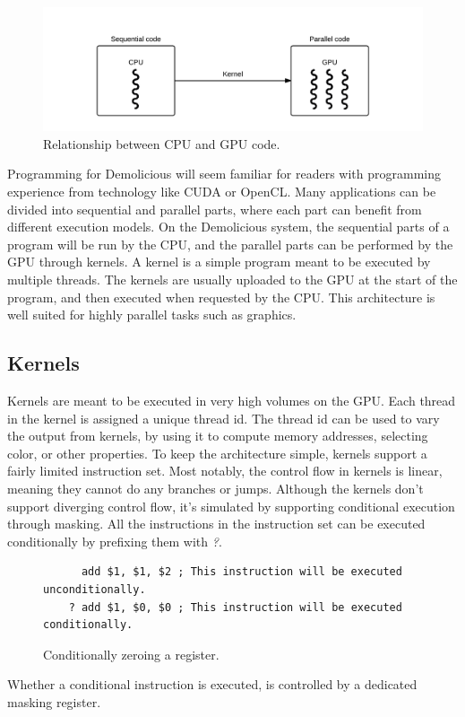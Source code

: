 \begin{figure}[H]
	\centering
	\includegraphics[width=\textwidth]{system_overview/diagrams/programming_model_cpu_gpu.png}
	\caption{Relationship between CPU and GPU code.}
	\label{fig:programming_model_cpu_gpu}
\end{figure}
Programming for Demolicious will seem familiar for readers with programming experience from technology like CUDA or OpenCL. 
Many applications can be divided into sequential and parallel parts, where each part can benefit from different execution models. 
On the Demolicious system, the sequential parts of a program will be run by the CPU, and the parallel parts can be performed by the GPU through kernels.
A kernel is a simple program meant to be executed by multiple threads.
The kernels are usually uploaded to the GPU at the start of the program, and then executed when requested by the CPU.
This architecture is well suited for highly parallel tasks such as graphics.

\subsection{Kernels}
Kernels are meant to be executed in very high volumes on the GPU.
Each thread in the kernel is assigned a unique thread id.
The thread id can be used to vary the output from kernels, 
by using it to compute memory addresses, selecting color, or other properties.
To keep the architecture simple, kernels support a fairly limited instruction set.
Most notably, the control flow in kernels is linear, meaning they cannot do any branches or jumps.
Although the kernels don't support diverging control flow,
it's simulated by supporting conditional execution through masking.
All the instructions in the instruction set can be executed conditionally by prefixing them with \textit{?}.
\begin{figure}[H]
	\centering
	\begin{verbatim}
	  add $1, $1, $2 ; This instruction will be executed unconditionally.
	? add $1, $0, $0 ; This instruction will be executed conditionally.
	\end{verbatim}
	\caption{Conditionally zeroing a register.}
	\label{fig:conditional_execution}
\end{figure}
Whether a conditional instruction is executed, is controlled by a dedicated masking register. 

